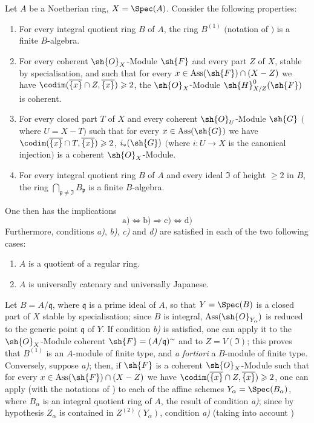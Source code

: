 \begin{corollary}[5.11.6]
\label{IV.5.11.6}
Let $A$ be a Noetherian ring, $X=\Spec(A)$.
Consider the following properties:
\begin{enumerate}
  \item[\rm a)] For every integral quotient ring $B$ of $A$, the ring $B^{(1)}$ $($notation of $)$ is a finite $B$-algebra.
  \item[\rm b)] For every coherent $\sh{O}_X$-Module $\sh{F}$ and every part $Z$ of $X$, stable by specialisation, and such that for every $x\in\operatorname{Ass}(\sh{F})\cap(X-Z)$ we have $\codim(\overline{\{x\}}\cap Z,\overline{\{x\}})\geqslant 2$, the $\sh{O}_X$-Module $\sh{H}^0_{X/Z}(\sh{F})$ is coherent.
  \item[\rm c)] For every closed part $T$ of $X$ and every coherent $\sh{O}_U$-Module $\sh{G}$ $($where $U=X-T$$)$ such that for every $x\in\operatorname{Ass}(\sh{G})$ we have $\codim(\overline{\{x\}}\cap T,\overline{\{x\}})\geqslant 2$, $i_*(\sh{G})$ $($where $i:U\to X$ is the canonical injection$)$ is a coherent $\sh{O}_X$-Module.
  \item[\rm d)] For every integral quotient ring $B$ of $A$ and every ideal $\mathfrak{I}$ of height $\geqslant 2$ in $B$, the ring $\bigcap_{\mathfrak{p}\neq\mathfrak{I}} B_\mathfrak{p}$ is a finite $B$-algebra.
\end{enumerate}
One then has the implications
\[
  \text{a)}\Leftrightarrow\text{b)}\Rightarrow\text{c)}\Leftrightarrow\text{d)}
\]
Furthermore, conditions \emph{a)}, \emph{b)}, \emph{c)} and \emph{d)} are satisfied in each of the two following cases:
\begin{enumerate}
  \item[\rm(i)] $A$ is a quotient of a regular ring.
  \item[\rm(ii)] $A$ is universally catenary and universally Japanese.
\end{enumerate}
Let $B=A/\mathfrak{q}$, where $\mathfrak{q}$ is a prime ideal of $A$, so that $Y=\Spec(B)$ is a closed part of $X$ stable by specialisation; since $B$ is integral, $\operatorname{Ass}(\sh{O}_{Y_\alpha})$ is reduced to the generic point $\mathfrak{q}$ of $Y$.
If condition \emph{b)} is satisfied, one can apply it to the $\sh{O}_X$-Module coherent $\sh{F}=(A/\mathfrak{q})^\sim$ and to $Z=V(\mathfrak{I})$; this proves that $B^{(1)}$ is an $A$-module of finite type, and \emph{a fortiori} a $B$-module of finite type.
Conversely, suppose \emph{a)}; then, if $\sh{F}$ is a coherent $\sh{O}_X$-Module such that for every $x\in\operatorname{Ass}(\sh{F})\cap(X-Z)$ we have $\codim(\overline{\{x\}}\cap Z,\overline{\{x\}})\geqslant 2$, one can apply (with the notations of ) to each of the affine schemes $Y_\alpha=\Spec(B_\alpha)$, where $B_\alpha$ is an integral quotient ring of $A$, the result of condition \emph{a)}; since by hypothesis $Z_\alpha$ is contained in $Z^{(2)}(Y_\alpha)$, condition \emph{a)} (taking into account )


\end{corollary}
